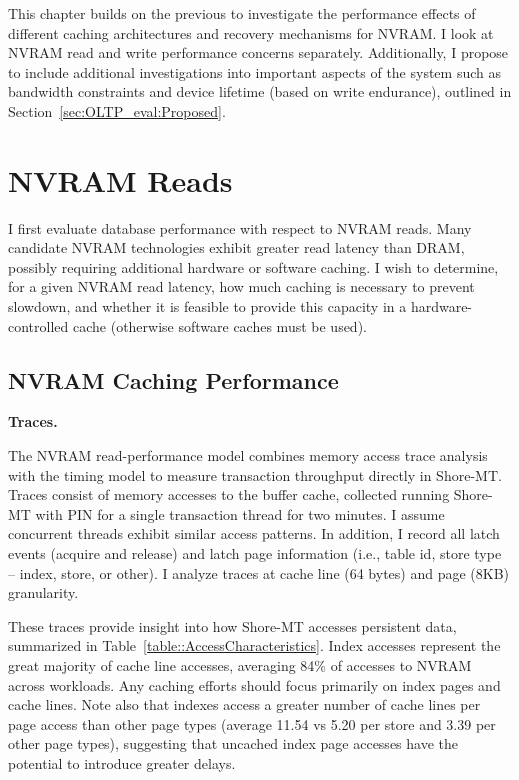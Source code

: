 This chapter builds on the previous to investigate the performance effects of different caching architectures and recovery mechanisms for NVRAM.
I look at NVRAM read and write performance concerns separately.
Additionally, I propose to include additional investigations into important aspects of the system such as bandwidth constraints and device lifetime (based on write endurance), outlined in Section~\ref{sec:OLTP_eval:Proposed}.

\section{NVRAM Reads}
\label{sec:OLTP_eval:Reads}

I first evaluate database performance with respect to NVRAM reads.
Many candidate NVRAM technologies exhibit greater read latency than DRAM, possibly requiring additional hardware or software caching.
I wish to determine, for a given NVRAM read latency, how much caching is necessary to prevent slowdown, and whether it is feasible to provide this capacity in a hardware-controlled cache (otherwise software caches must be used).

\subsection{NVRAM Caching Performance}
\label{sec:OLTP_eval:Reads:Performance}

\textbf{Traces.}

The NVRAM read-performance model combines memory access trace analysis with the timing model to measure transaction throughput directly in Shore-MT.
Traces consist of memory accesses to the buffer cache, collected running Shore-MT with PIN for a single transaction thread for two minutes.
I assume concurrent threads exhibit similar access patterns.
In addition, I record all latch events (acquire and release) and latch page information (i.e., table id, store type -- index, store, or other).
I analyze traces at cache line (64 bytes) and page (8KB) granularity.

These traces provide insight into how Shore-MT accesses persistent data, summarized in Table~\ref{table::AccessCharacteristics}.
Index accesses represent the great majority of cache line accesses, averaging 84\% of accesses to NVRAM across workloads.
Any caching efforts should focus primarily on index pages and cache lines.
Note also that indexes access a greater number of cache lines per page access than other page types (average 11.54 vs 5.20 per store and 3.39 per other page types), suggesting that uncached index page accesses have the potential to introduce greater delays. 

